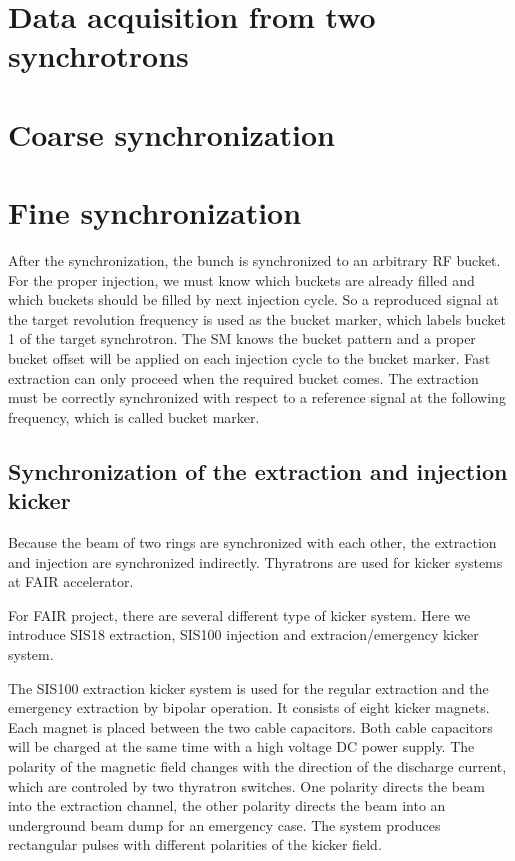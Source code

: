 \section{Data acquisition from two synchrotrons}
\section{Coarse synchronization}
\section{Fine synchronization}


After the synchronization, the bunch is synchronized to an arbitrary RF bucket. For the proper injection, we must know which buckets are already filled and which buckets should be filled by next injection cycle. So a reproduced signal at the target revolution frequency is used as the bucket marker, which labels bucket 1 of the target synchrotron. The SM knows the bucket pattern and a proper bucket offset will be applied on each injection cycle to the bucket marker. 
Fast extraction can only proceed when the required bucket comes. The extraction must be correctly synchronized with respect to a reference signal at the following frequency, which is called bucket marker.

\subsection{Synchronization of the extraction and injection kicker}

 Because the beam of two rings are synchronized with each other, the extraction and injection are synchronized indirectly. Thyratrons are used for kicker systems at FAIR accelerator.

For FAIR project, there are several different type of kicker system. Here we introduce SIS18 extraction, SIS100 injection and extracion/emergency kicker system.

The SIS100 extraction kicker system is used for the regular extraction and the emergency extraction by bipolar operation. It consists of eight kicker magnets. Each magnet is placed between the two cable capacitors. Both cable capacitors will be charged at the same time with a high voltage DC power supply. The polarity of the magnetic field changes with the direction of the discharge current, which are controled by two thyratron switches. One polarity directs the beam into the extraction channel, the other polarity directs the beam into an underground beam dump for an emergency case. The system produces rectangular pulses with different polarities of the kicker field.

